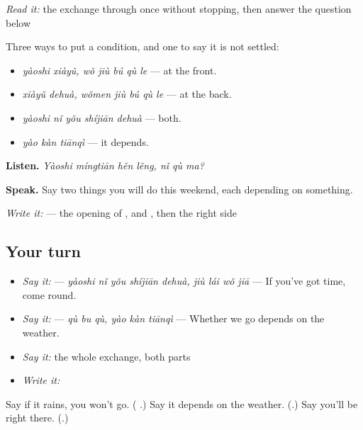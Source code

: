 \begin{tcolorbox}[breakable,skin=enhanced,colback=orange!6,colframe=orange!45!black,boxrule=0.5pt,arc=1mm,left=6pt,right=6pt,top=4pt,bottom=4pt,fonttitle=\bfseries,title={Read this}]
\emph{Read it:} the exchange through once without stopping, then answer the question below
\end{tcolorbox}

\begin{grammarlens}[title={What you've built — if, and what it depends on}]
Three ways to put a condition, and one to say it is not settled:

\begin{itemize}
\raggedright
  \item \textbf{ } \emph{yàoshi xiàyǔ, wǒ jiù bú qù le} —  at the front.
  \item \textbf{ } \emph{xiàyǔ dehuà, wǒmen jiù bú qù le} —  at the back.
  \item \textbf{} \emph{yàoshi nǐ yǒu shíjiān dehuà} — both.
  \item \textbf{} \emph{yào kàn tiānqì} — it depends.
\end{itemize}

\textbf{Listen.} \emph{Yàoshi míngtiān hěn lěng, nǐ qù ma?}

\textbf{Speak.} Say two things you will do this weekend, each depending on something.

\emph{Write it:}  — the opening of ,  and , then the right side
\end{grammarlens}

\subsection*{Your turn}
\begin{itemize}
\raggedright
  \item \emph{Say it:}   — \emph{yàoshi nǐ yǒu shíjiān dehuà, jiù lái wǒ jiā} — If you've got time, come round.
  \item \emph{Say it:}   — \emph{qù bu qù, yào kàn tiānqì} — Whether we go depends on the weather.
  \item \emph{Say it:} the whole exchange, both parts
  \item \emph{Write it:}  
\end{itemize}

\begin{tcolorbox}[breakable,colback=teal!4,colframe=teal!35!black,title={Before you move on}]
Say if it rains, you won't go. (\textbf{ }.) Say it depends on the weather. (\textbf{}.) Say you'll be right there. (\textbf{}.)
\end{tcolorbox}
